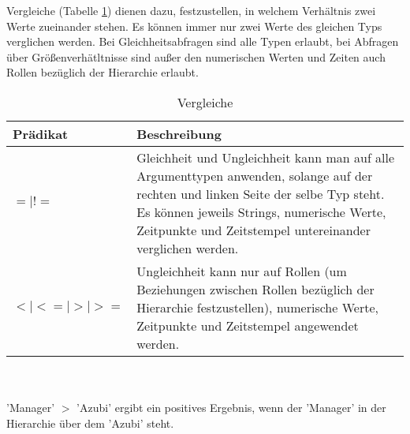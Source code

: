 Vergleiche (Tabelle \ref{tab:comparison}) dienen dazu, festzustellen, in welchem Verhältnis zwei Werte zueinander stehen. Es können immer nur zwei Werte des gleichen Typs verglichen werden. Bei Gleichheitsabfragen sind alle Typen erlaubt, bei Abfragen über Größenverhätltnisse sind außer den numerischen Werten und Zeiten auch Rollen bezüglich der Hierarchie erlaubt.
\begin{table}[h]
\begin{tabular} {|p{6cm}|p{10cm}|}
\hline
\textbf{Prädikat} & \textbf{Beschreibung}\\
\hline
 $= | !=$		& Gleichheit und Ungleichheit kann man auf alle Argumenttypen anwenden, solange auf der rechten und linken Seite der selbe Typ steht. Es können jeweils Strings, numerische Werte, Zeitpunkte und Zeitstempel untereinander verglichen werden. \\
\hline
 $< | <= | > | >=$   	& Ungleichheit kann nur auf Rollen (um Beziehungen zwischen Rollen bezüglich der Hierarchie festzustellen), numerische Werte, Zeitpunkte und Zeitstempel angewendet werden. \\
\hline
\end{tabular}
\\\\\small 'Manager' $>$ 'Azubi' ergibt ein positives Ergebnis, wenn der 'Manager' in der Hierarchie über dem 'Azubi' steht.
\caption{Vergleiche}
\label{tab:comparison}
\end{table}

